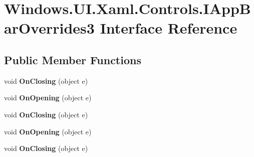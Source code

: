 \hypertarget{interface_windows_1_1_u_i_1_1_xaml_1_1_controls_1_1_i_app_bar_overrides3}{}\section{Windows.\+U\+I.\+Xaml.\+Controls.\+I\+App\+Bar\+Overrides3 Interface Reference}
\label{interface_windows_1_1_u_i_1_1_xaml_1_1_controls_1_1_i_app_bar_overrides3}
\subsection*{Public Member Functions}
\begin{DoxyCompactItemize}
\item 
\mbox{\label{interface_windows_1_1_u_i_1_1_xaml_1_1_controls_1_1_i_app_bar_overrides3_a74ddaa1e19579219f9d3bceb70019653}} 
void {\bfseries On\+Closing} (object e)
\item 
\mbox{\label{interface_windows_1_1_u_i_1_1_xaml_1_1_controls_1_1_i_app_bar_overrides3_ab04fbf60e05e35f50544a19f79167d6c}} 
void {\bfseries On\+Opening} (object e)
\item 
\mbox{\label{interface_windows_1_1_u_i_1_1_xaml_1_1_controls_1_1_i_app_bar_overrides3_a74ddaa1e19579219f9d3bceb70019653}} 
void {\bfseries On\+Closing} (object e)
\item 
\mbox{\label{interface_windows_1_1_u_i_1_1_xaml_1_1_controls_1_1_i_app_bar_overrides3_ab04fbf60e05e35f50544a19f79167d6c}} 
void {\bfseries On\+Opening} (object e)
\item 
\mbox{\label{interface_windows_1_1_u_i_1_1_xaml_1_1_controls_1_1_i_app_bar_overrides3_a74ddaa1e19579219f9d3bceb70019653}} 
void {\bfseries On\+Closing} (object e)
\item 
\mbox{\label{interface_windows_1_1_u_i_1_1_xaml_1_1_controls_1_1_i_app_bar_overrides3_ab04fbf60e05e35f50544a19f79167d6c}} 

\end{DoxyCompactItemize}
